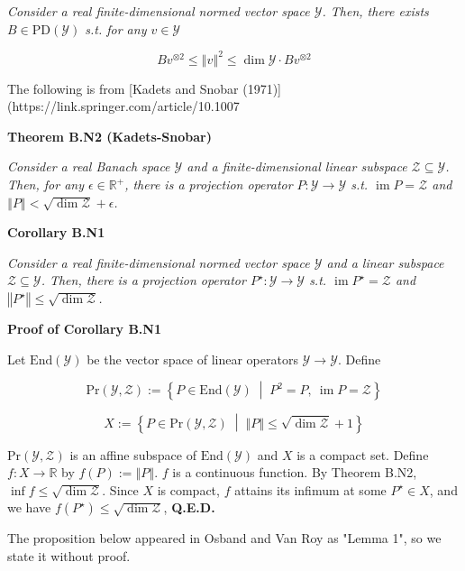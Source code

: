 \documentclass[a4paper]{article}
\newcommand{\Co}[1]{}
\newcommand{\AP}[1]{\left(#1\right)}
\newcommand{\ACM}[2]{\left\{#1\;\middle\vert\;#2\right\}}
\newcommand{\Reals}{\mathbb{R}}
\newcommand{\PD}{\mathrm{PD}}
\newcommand{\End}{\mathrm{End}}
\DeclareMathOperator{\Img}{im}
\newcommand{\Norm}[1]{\left\Vert #1 \right\Vert}
\newcommand{\Y}{\mathcal{Y}}
\newcommand{\Z}{\mathcal{Z}}
\begin{document}
\textit{Consider a real finite-dimensional normed vector space $\Y$. Then, there exists $B\in\PD(\Y)$ s.t. for any $v\in\Y$}\Co{i}

$$Bv^{\otimes2}\leq\Norm{v}^2\leq\dim{\Y}\cdot Bv^{\otimes2}$$

The following is from [Kadets and Snobar (1971)](https://link.springer.com/article/10.1007%

\textbf{Theorem B.N2 (Kadets-Snobar)}\Co{b}

\textit{Consider a real Banach space $\Y$ and a finite-dimensional linear subspace $\Z\subseteq\Y$. Then, for any $\epsilon\in\Reals^+$, there is a projection operator $P:\Y\rightarrow\Y$ s.t. $\Img{P}=\Z$ and $\Norm{P}<\sqrt{\dim{\Z}}+\epsilon$.}\Co{i}

\textbf{Corollary B.N1}\Co{b}

\textit{Consider a real finite-dimensional normed vector space $\Y$ and a linear subspace $\Z\subseteq\Y$. Then, there is a projection operator $P^\star:\Y\rightarrow\Y$ s.t. $\Img{P^\star}=\Z$ and $\Norm{P^\star}\leq\sqrt{\dim{\Z}}$.}\Co{i}

\textbf{Proof of Corollary B.N1}\Co{b}

Let $\End(\Y)$ be the vector space of linear operators $\Y\rightarrow\Y$. Define

$$\mathrm{Pr}(\Y,\Z):=\ACM{P\in\End(\Y)}{P^2=P,\ \Img{P}=\Z}$$

$$X:=\ACM{P\in\mathrm{Pr}(\Y,\Z)}{\Norm{P}\leq\sqrt{\dim{\Z}}+1}$$

$\mathrm{Pr}(\Y,\Z)$ is an affine subspace of $\End(\Y)$ and $X$ is a compact set. Define $f:X\rightarrow\Reals$ by $f(P):=\Norm{P}$. $f$ is a continuous function. By Theorem B.N2, $\inf f \leq \sqrt{\dim\Z}$. Since $X$ is compact, $f$ attains its infimum at some $P^\star\in X$, and we have $f\AP{P^\star} \leq \sqrt{\dim\Z}$, \textbf{Q.E.D.}\Co{b}


The proposition below appeared in Osband and Van Roy as "Lemma 1", so we state it without proof.
\end{document}
